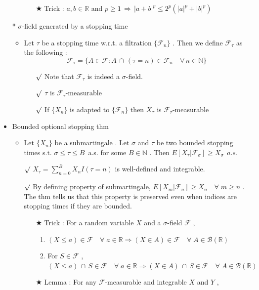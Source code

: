\documentclass[12pt, A4]{article}
\newcommand{\rmk}{$\surd$}
\newcommand{\trick}{$\bigstar$}
\newcommand{\N}{\mathbb{N}}
\newcommand{\R}{\mathbb{R}}
\newcommand{\B}{\mathcal{B}}
\newcommand{\F}{\mathcal{F}}
\newcommand{\intersect}{\,\cap\,}
\newcommand{\foranyn}{\quad \forall \, n\in \N}
\begin{document}
\begin{itemize}
\begin{itemize}
		\begin{itemize}
			\item[\trick] Trick : $a,b\in \R$ and $p\geq 1\,\Rightarrow\, |a+b|^p\leq 2^p(|a|^p+|b|^p)$  
		\end{itemize} 
	\end{itemize}
	\item[*] $\sigma$-field generated by a stopping time
	\begin{itemize}
		\item Let $\tau$ be a stopping time w.r.t. a filtration $\{\F_n\}$ . Then we define $\F_\tau$ as the following : 
		$$
			\F_\tau = \{A\in \F : A\intersect (\tau=n)\in \F_n \foranyn\}
		$$
		\begin{itemize}
			\item[\rmk] Note that $\F_\tau$ is indeed a $\sigma$-field. 
			\item[\rmk] $\tau$ is $\F_\tau$-measurable
			\item[\rmk] If $\{X_n\}$ is adapted to $\{\F_n\}$ then $X_\tau$ is $\F_\tau$-measurable
		\end{itemize}
	\end{itemize}
	\item Bounded optional stopping thm
	\begin{itemize}
		\item Let $\{X_n\}$ be a submartingale . Let $\sigma$ and $\tau$ be two bounded stopping times s.t. $\sigma\leq \tau\leq B$\;\, a.s. for some $B\in \N$ . Then $E[X_\tau |\F_\sigma] \geq X_\sigma\;\, a.s.$
		\item[\rmk] $X_\tau = \sum_{n=0}^B X_nI(\tau=n)$ is well-defined and integrable. 
		\item[\rmk] By defining property of submartingale, $E[X_m|\F_n]\geq X_n \quad \forall \;m\geq n$ . The thm tells us that this property is preserved even when indices are stopping times if they are bounded.
		\begin{itemize}
			\item[\trick] Trick : For a random variable $X$ and a $\sigma$-field $\F$ ,
			\begin{enumerate}
				\item $(X\leq a)\in \F \quad \forall \; a\in \R\Rightarrow (X\in A)\in \F \quad \forall \; A\in \B(\R)$
				\item For $S\in \F$ , $(X\leq a)\intersect S\in \F \quad \forall \; a\in \R\Rightarrow (X\in A)\intersect S \in \F \quad \forall \; A\in \B(\R)$
			\end{enumerate}
			\item[\trick] Lemma : For any $\F$-measurable and integrable $X$ and $Y$ ,

\end{itemize}
\end{itemize}
\end{itemize}
\end{document}
